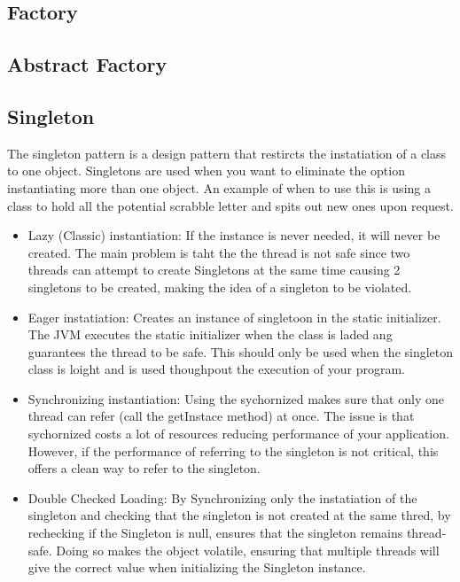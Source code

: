 \documentclass[a4paper, 11pt]{article}
\begin{document}
    \subsection{Factory}

    \subsection{Abstract Factory}

    \subsection{Singleton}
        The singleton pattern is a design pattern that restircts the instatiation of a class to one object.
        \newline\newline
        Singletons are used when you want to eliminate the option instantiating more than one object.  An example of when to use this is using a class to hold all the potential scrabble letter and spits out new ones upon request.
        \begin{itemize}
            \item Lazy (Classic) instantiation: If the instance is never needed, it will never be created.  The main problem is taht the the thread is not safe since two threads can attempt to create Singletons at the same time causing 2 singletons to be created, making the idea of a singleton to be violated.
            \item Eager instatiation: Creates an instance of singletoon in the static initializer.  The JVM executes the static initializer when the class is laded ang guarantees the thread to be safe.  This should only be used when the singleton class is loight and is used thoughpout the execution of your program.
            \item Synchronizing instantiation: Using the sychornized makes sure that only one thread can refer (call the getInstace method) at once.  The issue is that sychornized costs a lot of resources reducing performance of your application.  However, if the performance of referring to the singleton is not critical, this offers a clean way to refer to the singleton.
            \item Double Checked Loading: By Synchronizing only the instatiation of the singleton and checking that the singleton is not created at the same thred, by rechecking if the Singleton is null, ensures that the singleton remains thread-safe.  Doing so makes the object volatile, ensuring that multiple threads will give the correct value when initializing the Singleton instance.
        \end{itemize}
\end{document}
